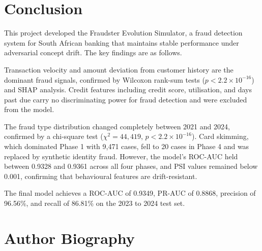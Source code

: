 \documentclass[12pt, a4paper]{article}
\begin{document}
\section{Conclusion}

This project developed the Fraudster Evolution Simulator, a fraud detection system for South African banking that maintains stable performance under adversarial concept drift. The key findings are as follows.

Transaction velocity and amount deviation from customer history are the dominant fraud signals, confirmed by Wilcoxon rank-sum tests ($p < 2.2 \times 10^{-16}$) and SHAP analysis. Credit features including credit score, utilisation, and days past due carry no discriminating power for fraud detection and were excluded from the model.

The fraud type distribution changed completely between 2021 and 2024, confirmed by a chi-square test ($\chi^2 = 44{,}419$, $p < 2.2 \times 10^{-16}$). Card skimming, which dominated Phase 1 with 9,471 cases, fell to 20 cases in Phase 4 and was replaced by synthetic identity fraud. However, the model's ROC-AUC held between 0.9328 and 0.9361 across all four phases, and PSI values remained below 0.001, confirming that behavioural features are drift-resistant.

The final model achieves a ROC-AUC of 0.9349, PR-AUC of 0.8868, precision of 96.56\%, and recall of 86.81\% on the 2023 to 2024 test set.

\section{Author Biography}
\end{document}
